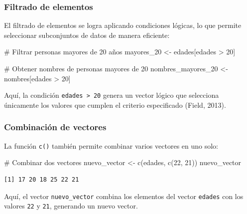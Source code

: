 \documentclass[
  spanish,
  a4paper,
  DIV=11,
  numbers=noendperiod,
  onepage,
  openany]{scrreprt}
\newenvironment{Shaded}{\begin{snugshade}}{\end{snugshade}}
\newcommand{\CommentTok}[1]{\textcolor[rgb]{0.37,0.37,0.37}{#1}}
\newcommand{\DecValTok}[1]{\textcolor[rgb]{0.68,0.00,0.00}{#1}}
\newcommand{\FunctionTok}[1]{\textcolor[rgb]{0.28,0.35,0.67}{#1}}
\newcommand{\NormalTok}[1]{\textcolor[rgb]{0.00,0.23,0.31}{#1}}
\newcommand{\OtherTok}[1]{\textcolor[rgb]{0.00,0.23,0.31}{#1}}
\newcommand{\SpecialCharTok}[1]{\textcolor[rgb]{0.37,0.37,0.37}{#1}}
\begin{document}
\subsubsection{\texorpdfstring{\textbf{Filtrado de
elementos}}{Filtrado de elementos}}\label{filtrado-de-elementos}

El filtrado de elementos se logra aplicando condiciones lógicas, lo que
permite seleccionar subconjuntos de datos de manera eficiente:

\begin{Shaded}
\begin{Highlighting}[]
\CommentTok{\# Filtrar personas mayores de 20 años}
\NormalTok{mayores\_20 }\OtherTok{\textless{}{-}}\NormalTok{ edades[edades }\SpecialCharTok{\textgreater{}} \DecValTok{20}\NormalTok{]}

\CommentTok{\# Obtener nombres de personas mayores de 20}
\NormalTok{nombres\_mayores\_20 }\OtherTok{\textless{}{-}}\NormalTok{ nombres[edades }\SpecialCharTok{\textgreater{}} \DecValTok{20}\NormalTok{]}
\end{Highlighting}
\end{Shaded}

Aquí, la condición \texttt{edades\ \textgreater{}\ 20} genera un vector
lógico que selecciona únicamente los valores que cumplen el criterio
especificado (Field, 2013).

\subsubsection{\texorpdfstring{\textbf{Combinación de
vectores}}{Combinación de vectores}}\label{combinaciuxf3n-de-vectores}

La función \texttt{c()} también permite combinar varios vectores en uno
solo:

\begin{Shaded}
\begin{Highlighting}[]
\CommentTok{\# Combinar dos vectores}
\NormalTok{nuevo\_vector }\OtherTok{\textless{}{-}} \FunctionTok{c}\NormalTok{(edades, }\FunctionTok{c}\NormalTok{(}\DecValTok{22}\NormalTok{, }\DecValTok{21}\NormalTok{))}
\NormalTok{nuevo\_vector}
\end{Highlighting}
\end{Shaded}

\begin{verbatim}
[1] 17 20 18 25 22 21
\end{verbatim}

Aquí, el vector \texttt{nuevo\_vector} combina los elementos del vector
\texttt{edades} con los valores \texttt{22} y \texttt{21}, generando un
nuevo vector.
\end{document}

